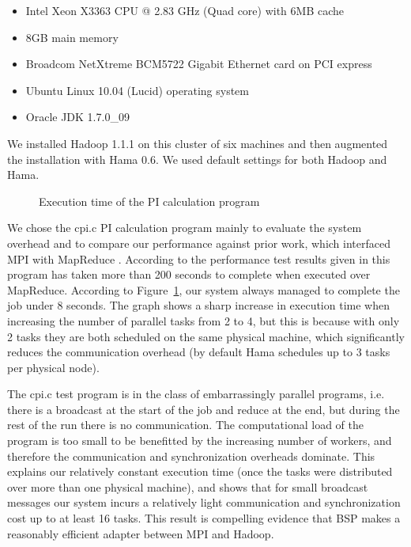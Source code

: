 \documentclass[conference,10pt] {IEEEtran}
\begin{document}
\begin{itemize}
\item Intel Xeon X3363 CPU @ 2.83 GHz (Quad core) with 6MB cache
\item 8GB main memory
\item Broadcom NetXtreme BCM5722 Gigabit Ethernet card on PCI express
\item Ubuntu Linux 10.04 (Lucid) operating system
\item Oracle JDK 1.7.0\_09
\end{itemize}

We installed Hadoop 1.1.1 on this cluster of six machines and then augmented the installation with Hama 0.6. We used default settings for both Hadoop and Hama.

\begin{figure}[t]
  \centering
  \caption{Execution time of the PI calculation program}
  \label{fig-cpic}
\end{figure}

We chose the cpi.c PI calculation program mainly to evaluate the system
overhead and to compare our performance against prior work, which interfaced
MPI with MapReduce \cite{SS12}. According to the performance test results given
in \cite{SS12} this program has taken more than 200 seconds to complete when
executed over MapReduce. According to Figure~\ref{fig-cpic}, our system always
managed to complete the job under 8 seconds. The graph shows a sharp increase
in execution time when increasing the number of parallel tasks from 2 to 4, but
this is because with only 2 tasks they are both scheduled on the same physical
machine, which significantly reduces the communication overhead (by default
Hama schedules up to 3 tasks per physical node).

The cpi.c test program is in the class of embarrassingly parallel programs,
i.e. there is a broadcast at the start of the job and reduce at the end, but
during the rest of the run there is no communication. The computational load
of the program is too small to be benefitted by the increasing number of workers,
 and therefore the communication and synchronization overheads dominate. This explains our
relatively constant execution time (once the tasks were distributed over more
than one physical machine), and shows that for small broadcast messages our
system incurs a relatively light communication and synchronization cost up to at least 16 tasks.
This result is compelling evidence that BSP makes a reasonably efficient
adapter between MPI and Hadoop.
\end{document}
